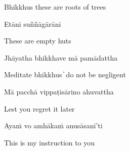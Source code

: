 \begin{english}
Bhikkhus these are roots of trees
\end{english}

\begin{twochants}
Etāni suññāgārāni
\end{twochants}

\begin{english}
These are empty huts
\end{english}

\begin{twochants}
Jhāyatha bhikkhave mā pamādattha
\end{twochants}

\begin{english}
Meditate bhikkhus  ̓  do not be negligent
\end{english}

\begin{twochants}
Mā pacchā vippaṭisārino ahuvattha
\end{twochants}

\begin{english}
Lest you regret it later
\end{english}

\begin{twochants}
Ayaṁ vo amhākaṁ anusāsanī’ti
\end{twochants}

\begin{english}
This is my instruction to you
\end{english}

